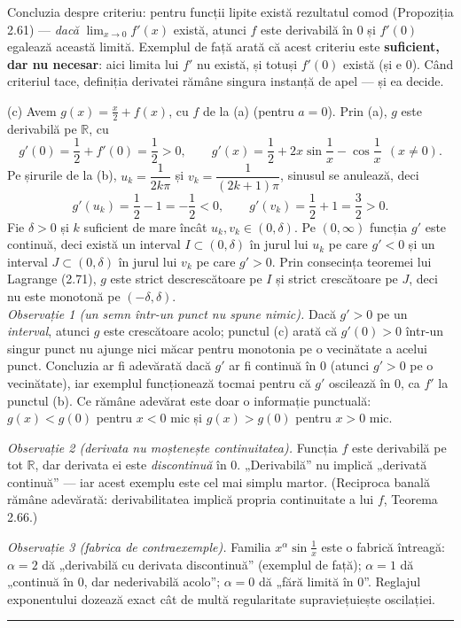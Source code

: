 Concluzia despre criteriu: pentru funcții lipite există rezultatul comod (Propoziția 2.61) --- \emph{dacă} $\lim_{x\to0}f'(x)$ există, atunci $f$ este derivabilă în $0$ și $f'(0)$ egalează această limită. Exemplul de față arată că acest criteriu este \textbf{suficient, dar nu necesar}: aici limita lui $f'$ nu există, și totuși $f'(0)$ există (și e $0$). Când criteriul tace, definiția derivatei rămâne singura instanță de apel --- și ea decide.

(c) Avem $g(x)=\frac x2+f(x)$, cu $f$ de la (a) (pentru $a=0$). Prin (a), $g$ este derivabilă pe $\mathbb{R}$, cu
\[ g'(0)=\frac12+f'(0)=\frac12>0,\qquad g'(x)=\frac12+2x\sin\frac1x-\cos\frac1x\ \ (x\neq0) . \]
Pe șirurile de la (b), $u_{k}=\dfrac{1}{2k\pi}$ și $v_{k}=\dfrac{1}{(2k+1)\pi}$, sinusul se anulează, deci
\[ g'(u_{k})=\frac12-1=-\frac12<0,\qquad g'(v_{k})=\frac12+1=\frac32>0 . \]
Fie $\delta>0$ și $k$ suficient de mare încât $u_{k},v_{k}\in(0,\delta)$. Pe $(0,\infty)$ funcția $g'$ este continuă, deci există un interval $I\subset(0,\delta)$ în jurul lui $u_{k}$ pe care $g'<0$ și un interval $J\subset(0,\delta)$ în jurul lui $v_{k}$ pe care $g'>0$. Prin consecința teoremei lui Lagrange (2.71), $g$ este strict descrescătoare pe $I$ și strict crescătoare pe $J$, deci nu este monotonă pe $(-\delta,\delta)$.\\[2pt]
\emph{Observație 1 (un semn într-un punct nu spune nimic).} Dacă $g'>0$ pe un \emph{interval}, atunci $g$ este crescătoare acolo; punctul (c) arată că $g'(0)>0$ într-un singur punct nu ajunge nici măcar pentru monotonia pe o vecinătate a acelui punct. Concluzia ar fi adevărată dacă $g'$ ar fi continuă în $0$ (atunci $g'>0$ pe o vecinătate), iar exemplul funcționează tocmai pentru că $g'$ oscilează în $0$, ca $f'$ la punctul (b). Ce rămâne adevărat este doar o informație punctuală: $g(x)<g(0)$ pentru $x<0$ mic și $g(x)>g(0)$ pentru $x>0$ mic.

\emph{Observație 2 (derivata nu moștenește continuitatea).} Funcția $f$ este derivabilă pe tot $\mathbb{R}$, dar derivata ei este \emph{discontinuă} în $0$. „Derivabilă'' nu implică „derivată continuă'' --- iar acest exemplu este cel mai simplu martor. (Reciproca banală rămâne adevărată: derivabilitatea implică propria continuitate a lui $f$, Teorema 2.66.)

\emph{Observație 3 (fabrica de contraexemple).} Familia $x^{\alpha}\sin\frac1x$ este o fabrică întreagă: $\alpha=2$ dă „derivabilă cu derivata discontinuă'' (exemplul de față); $\alpha=1$ dă „continuă în $0$, dar nederivabilă acolo''; $\alpha=0$ dă „fără limită în $0$''. Reglajul exponentului dozează exact cât de multă regularitate supraviețuiește oscilației.
\vspace{1mm}\hrule

